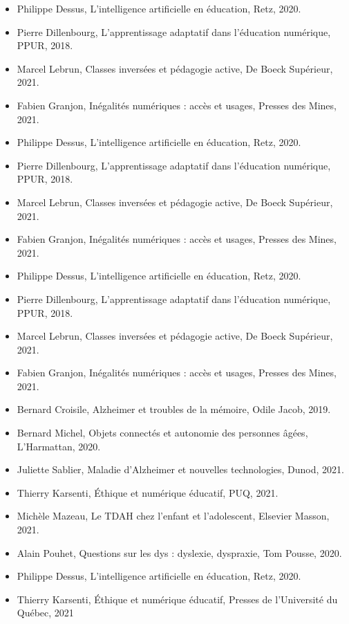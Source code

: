 \documentclass[11pt,a4paper]{report}
\begin{document}
\begin{itemize}
    \item Philippe Dessus, L’intelligence artificielle en éducation, Retz, 2020.
    \item Pierre Dillenbourg, L’apprentissage adaptatif dans l’éducation numérique, PPUR, 2018.
    \item Marcel Lebrun, Classes inversées et pédagogie active, De Boeck Supérieur, 2021.
    \item Fabien Granjon, Inégalités numériques : accès et usages, Presses des Mines, 2021.

    \item Philippe Dessus, L’intelligence artificielle en éducation, Retz, 2020.
    \item Pierre Dillenbourg, L’apprentissage adaptatif dans l’éducation numérique, PPUR, 2018.
    \item Marcel Lebrun, Classes inversées et pédagogie active, De Boeck Supérieur, 2021.
    \item Fabien Granjon, Inégalités numériques : accès et usages, Presses des Mines, 2021.
    
    \item Philippe Dessus, L’intelligence artificielle en éducation, Retz, 2020.
    \item Pierre Dillenbourg, L’apprentissage adaptatif dans l’éducation numérique, PPUR, 2018.
    \item Marcel Lebrun, Classes inversées et pédagogie active, De Boeck Supérieur, 2021.
    \item Fabien Granjon, Inégalités numériques : accès et usages, Presses des Mines, 2021.
    
    \item Bernard Croisile, Alzheimer et troubles de la mémoire, Odile Jacob, 2019.
    \item Bernard Michel, Objets connectés et autonomie des personnes âgées, L'Harmattan, 2020.
    \item Juliette Sablier, Maladie d’Alzheimer et nouvelles technologies, Dunod, 2021.
    \item Thierry Karsenti, Éthique et numérique éducatif, PUQ, 2021.
    
    \item Michèle Mazeau, Le TDAH chez l'enfant et l'adolescent, Elsevier Masson, 2021.
    \item Alain Pouhet, Questions sur les dys : dyslexie, dyspraxie, Tom Pousse, 2020.
    \item Philippe Dessus, L’intelligence artificielle en éducation, Retz, 2020.
    \item Thierry Karsenti, Éthique et numérique éducatif, Presses de l’Université du Québec, 2021
    

\end{itemize}
\end{document}
